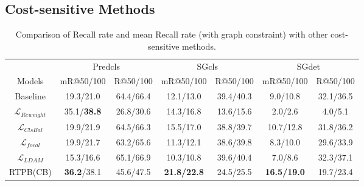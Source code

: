\subsection*{Cost-sensitive Methods}

\begin{table}[!ht]
	\centering
	\begin{tabular}{c|cc|cc|cc}
		\hline
		& \multicolumn{2}{c|}{Predcls} & \multicolumn{2}{c|}{SGcls} & \multicolumn{2}{c}{SGdet} \\
		Models                         & mR@50/100     & R@50/100     & mR@50/100    & R@50/100    & mR@50/100    & R@50/100    \\ \hline
		Baseline   & 19.3/21.0     & 64.4/66.4    & 12.1/13.0    & 39.4/40.3   & 9.0/10.8     & 32.1/36.5           \\
		$\mathcal{L}_{Reweight}$  & 35.1/\textbf{38.8} & 26.8/30.6 & 14.3/16.8  & 13.6/15.6 & 2.0/2.6 & 4.0/5.1           \\
		$\mathcal{L}_{ClsBal}$     & 19.9/21.9 & 64.5/66.3 & 15.5/17.0  & 38.8/39.7 & 10.7/12.8 & 31.8/36.2           \\
		$\mathcal{L}_{focal}$     & 19.9/21.7 & 63.2/65.6 & 11.3/12.1  & 38.6/39.8 & 8.3/10.0 & 29.6/33.9          \\
		$\mathcal{L}_{LDAM}$      & 15.3/16.6 & 65.1/66.9 & 10.3/10.8    & 39.6/40.4  & 7.0/8.6 & 32.3/37.1        \\
		RTPB(CB)      & \textbf{36.2}/38.1    & 45.6/47.5    & \textbf{21.8/22.8}    & 24.5/25.5   & \textbf{16.5/19.0}    & 19.7/23.4 \\ \hline
	\end{tabular}
	\caption{Comparison of Recall rate and mean Recall rate (with graph constraint) with other cost-sensitive methods.}
	\label{tab:debias_supp}
\end{table}
